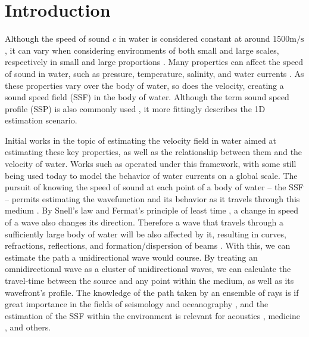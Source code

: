 \section{Introduction}

Although the speed of sound $c$ in water is considered constant at around $1500 \si{\meter}/\si{\second}$, it can vary when considering environments of both small and large scales, respectively in small and large proportions \cite{kieffer_sound_1977,trusler_determination_2017,li_sound_2015}. Many properties can affect the speed of sound in water, such as pressure, temperature, salinity, and water currents \cite{wilson_speed_1959,medwin_fundamentals_1998,mcdougall_getting_2011,delgrosso_new_1974}. As these properties vary over the body of water, so does the velocity, creating a sound speed field (SSF) in the body of water. Although the term sound speed profile (SSP) is also commonly used \cite{li_acoustic_2019,li_sound_2015,pinson_sound_2010}, it more fittingly describes the 1D estimation scenario.

Initial works in the topic of estimating the velocity field in water aimed at estimating these key properties, as well as the relationship between them and the velocity of water. Works such as \cite{wilson_speed_1959,medwin_fundamentals_1998,mcdougall_getting_2011,delgrosso_new_1974,chen_speed_1977,wong_speed_1995,roquet_accurate_2015} operated under this framework, with some still being used today to model the behavior of water currents on a global scale.
The pursuit of knowing the speed of sound at each point of a body of water -- the SSF -- permits estimating the wavefunction and its behavior as it travels through this medium \cite{li_acoustic_2019,pinson_sound_2010}. By Snell's law and Fermat's principle of least time \cite{perrine_fermat_1961}, a change in speed of a wave also changes its direction. Therefore a wave that travels through a sufficiently large body of water will be also affected by it, resulting in curves, refractions, reflections, and formation/dispersion of beams \cite{medwin_fundamentals_1998,cornuelle_ocean_2008}. With this, we can estimate the path a unidirectional wave would course. By treating an omnidirectional wave as a cluster of unidirectional waves, we can calculate the travel-time between the source and any point within the medium, as well as its wavefront's profile. The knowledge of the path taken by an ensemble of rays is if great importance in the fields of seismology \cite{meyerholtz_convolutional_1989,bormann_seismic_2012} and oceanography \cite{cornuelle_ocean_2008}, and the estimation of the SSF within the environment is relevant for acoustics \cite{holstein_acoustic_2004}, medicine \cite{hormati_robust_2010}, and others.

